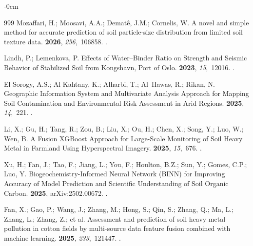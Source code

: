 \documentclass[environremediat,article,accept,pdftex,oneauthor]{Definitions/mdpi}
\begin{document}
\begin{adjustwidth}{-\extralength}{0cm}
\begin{thebibliography}{999}
Mozaffari, H.; Moosavi, A.A.; Demat{\^e}, J.M.; Cornelis, W.
\newblock A novel and simple method for accurate prediction of soil
  particle-size distribution from limited soil texture data.
 {\bf 2026}, {\em 256},~106858.
.

Lindh, P.; Lemenkova, P.
\newblock Effects of Water--Binder Ratio on Strength and Seismic Behavior of
  Stabilized Soil from Kongshavn, Port of Oslo.
 {\bf 2023}, {\em 15},~12016.
.

El-Sorogy, A.S.; Al-Kahtany, K.; Alharbi, T.; Al~Hawas, R.; Rikan, N.
\newblock Geographic Information System and Multivariate Analysis Approach for
  Mapping Soil Contamination and Environmental Risk Assessment in Arid Regions.
 {\bf 2025}, {\em 14},~221.
.

Li, X.; Gu, H.; Tang, R.; Zou, B.; Liu, X.; Ou, H.; Chen, X.; Song, Y.; Luo,
  W.; Wen, B.
\newblock A Fusion XGBoost Approach for Large-Scale Monitoring of Soil Heavy
  Metal in Farmland Using Hyperspectral Imagery.
 {\bf 2025}, {\em 15},~676.
.

Xu, H.; Fan, J.; Tao, F.; Jiang, L.; You, F.; Houlton, B.Z.; Sun, Y.; Gomes,
  C.P.; Luo, Y.
\newblock Biogeochemistry-Informed Neural Network (BINN) for Improving Accuracy
  of Model Prediction and Scientific Understanding of Soil Organic Carbon.
 {\bf 2025}, arXiv:2502.00672.
.

Fan, X.; Gao, P.; Wang, J.; Zhang, M.; Hong, S.; Qin, S.; Zhang, Q.; Ma, L.; Zhang, L.; Zhang, Z.; et al.
\newblock Assessment and prediction of soil heavy metal pollution in cotton
  fields by multi-source data feature fusion combined with machine learning.
 {\bf 2025}, {\em 233},~121447.
.


\end{thebibliography}
\end{adjustwidth}
\end{document}

